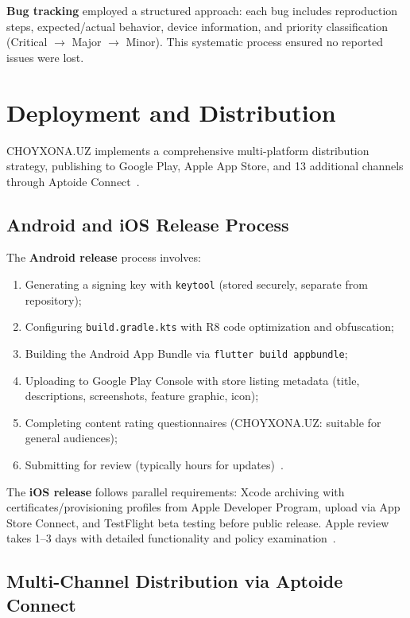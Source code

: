 \textbf{Bug tracking} employed a structured approach: each bug includes reproduction steps, expected/actual behavior, device information, and priority classification (Critical $\to$ Major $\to$ Minor).
This systematic process ensured no reported issues were lost.


\section{Deployment and Distribution}
\label{sec:deployment}

CHOYXONA.UZ implements a comprehensive multi-platform distribution strategy, publishing to Google Play, Apple App Store, and 13 additional channels through Aptoide Connect~\cite{jia2014}.

\subsection{Android and iOS Release Process}
\label{subsec:release-process}

The \textbf{Android release} process involves:
\begin{enumerate}
  \item Generating a signing key with \texttt{keytool} (stored securely, separate from repository);
  \item Configuring \texttt{build.gradle.kts} with R8 code optimization and obfuscation;
  \item Building the Android App Bundle via \texttt{flutter build appbundle};
  \item Uploading to Google Play Console with store listing metadata (title, descriptions, screenshots, feature graphic, icon);
  \item Completing content rating questionnaires (CHOYXONA.UZ: suitable for general audiences);
  \item Submitting for review (typically hours for updates)~\cite{windmill2020}.
\end{enumerate}

The \textbf{iOS release} follows parallel requirements: Xcode archiving with certificates/provisioning profiles from Apple Developer Program, upload via App Store Connect, and TestFlight beta testing before public release.
Apple review takes 1--3 days with detailed functionality and policy examination~\cite{napoli2021}.

\subsection{Multi-Channel Distribution via Aptoide Connect}
\label{subsec:aptoide}

